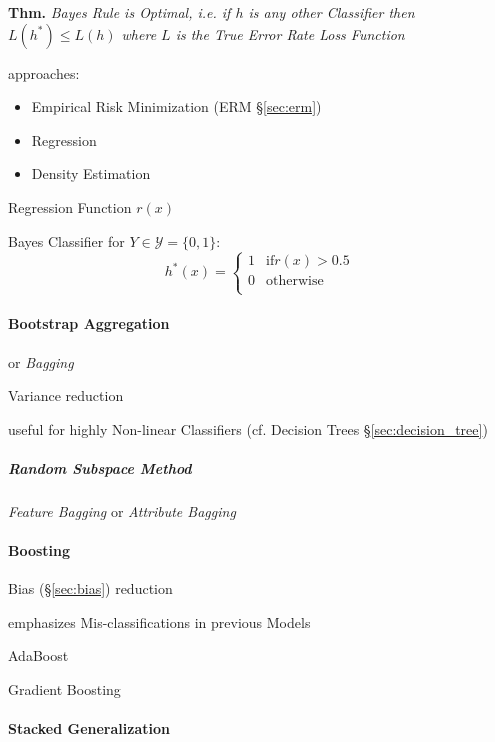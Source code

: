\textbf{Thm.} \emph{Bayes Rule is Optimal, i.e. if $h$ is any other Classifier
  then $L(h^*) \leq L(h)$ where $L$ is the True Error Rate Loss Function}

approaches:
\begin{itemize}
  \item Empirical Risk Minimization (ERM \S\ref{sec:erm})
  \item Regression
  \item Density Estimation
\end{itemize}

Regression Function $r(x)$

Bayes Classifier for $Y \in \mathcal{Y} = \{0, 1\}$:
\[
  h^*(x) = \begin{cases}
    1 & \text{if} r(x) > 0.5 \\
    0 & \text{otherwise} \\
  \end{cases}
\]



\paragraph{Bootstrap Aggregation}\label{sec:bootstrap_aggregation}\hfill

or \emph{Bagging}

Variance reduction

useful for highly Non-linear Classifiers (cf. Decision Trees
\S\ref{sec:decision_tree})



\subparagraph{Random Subspace Method}\label{sec:random_subspace_method}\hfill

\emph{Feature Bagging} or \emph{Attribute Bagging}



\paragraph{Boosting}\label{sec:boosting}\hfill

Bias (\S\ref{sec:bias}) reduction

emphasizes Mis-classifications in previous Models

AdaBoost

Gradient Boosting



\paragraph{Stacked Generalization}\label{sec:stacked_generalization}\hfill

